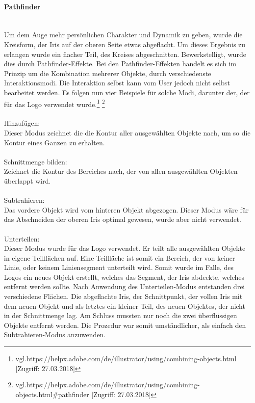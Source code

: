 \paragraph{Pathfinder}
\leavevmode \\
Um dem Auge mehr persönlichen Charakter und Dynamik zu geben, wurde die Kreisform, der Iris auf der oberen Seite etwas abgeflacht. Um dieses Ergebnis zu erlangen wurde ein flacher Teil, des Kreises abgeschnitten. Bewerkstelligt, wurde dies durch Pathfinder-Effekte. Bei den Pathfinder-Effekten handelt es sich im Prinzip um die Kombination mehrerer Objekte, durch verschiedenste Interaktionsmodi. Die Interaktion selbst kann vom User jedoch nicht selbst bearbeitet werden. Es folgen nun vier Beispiele für solche Modi, darunter der, der für das Logo verwendet wurde.\footnote{\label{} vgl.https://helpx.adobe.com/de/illustrator/using/combining-objects.html [Zugriff: 27.03.2018]}
\footnote{\label{} vgl.https://helpx.adobe.com/de/illustrator/using/combining-objects.html\#pathfinder  [Zugriff: 27.03.2018]}
\leavevmode \\
\leavevmode \\
Hinzufügen:
\leavevmode \\
Dieser Modus zeichnet die die Kontur aller ausgewählten Objekte nach, um so die Kontur eines Ganzen zu erhalten.
\leavevmode \\
\leavevmode \\
Schnittmenge bilden:
\leavevmode \\
Zeichnet die Kontur des Bereiches nach, der von allen ausgewählten Objekten überlappt wird.
\leavevmode \\
\leavevmode \\
Subtrahieren:
\leavevmode \\
Das vordere Objekt wird vom hinteren Objekt abgezogen. Dieser Modus wäre für das Abschneiden der oberen Iris optimal gewesen, wurde aber nicht verwendet.
\leavevmode \\
\leavevmode \\
Unterteilen:
\leavevmode \\
Dieser Modus wurde für das Logo verwendet. Er teilt alle ausgewählten Objekte in eigene Teilflächen auf. Eine Teilfläche ist somit ein Bereich, der von keiner Linie, oder keinem Liniensegment unterteilt wird. Somit wurde im Falle, des Logos ein neues Objekt erstellt, welches das Segment, der Iris abdeckte, welches entfernt werden sollte. Nach Anwendung des Unterteilen-Modus entstanden drei verschiedene Flächen. Die abgeflachte Iris, der Schnittpunkt, der vollen Iris mit dem neuen Objekt und als letztes ein kleiner Teil, des neuen Objektes, der nicht in der Schnittmenge lag. Am Schluss mussten nur noch die zwei überflüssigen Objekte entfernt werden. Die Prozedur war somit umständlicher, als einfach den Subtrahieren-Modus anzuwenden.
\leavevmode \\

